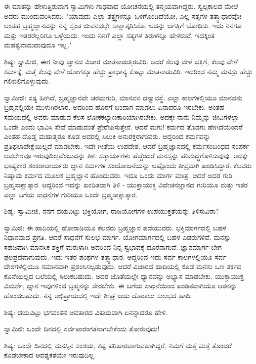 ಈ ಮಾತನ್ನು ಹೇಳುತ್ತಿರುವಾಗ ಸ್ವಾಮಿಗಳು ಗಾಢವಾದ ಯೋಚನೆಯಲ್ಲಿ ತನ್ಮಯವಾಗಿದ್ದರು. ಸ್ವಲ್ಪಕಾಲದ ಮೇಲೆ ಅವರು ಮುಂದುವರಿಸಿದರು: "ಯಾವುದು ಎಲ್ಲಾ ತತ್ತ್ವಗಳನ್ನೂ ಒಳಗೊಂಡಿದೆಯೋ, ಎಲ್ಲ ಸತ್ಯಗಳ ತತ್ತ್ವಾಧಾರವೋ ಅಂತಹ ಬ್ರಹ್ಮಜ್ಞಾನವನ್ನು ನಿನ್ನ ಸ್ವಂತ ಜೀವನದಲ್ಲೇ ಸಾಕ್ಷಾತ್ಕರಿಸಿಕೊ. ಅದನ್ನು ಜಗತ್ತಿಗೆ ಬೋಧಿಸು. ಇದು ನಿನಗೂ ಮತ್ತು ಇತರರೆಲ್ಲರಿಗೂ ಒಳ್ಳೆಯದು. ಇಂದು ನಿನಗೆ ಎಲ್ಲಾ ಸತ್ಯಗಳ ತಿರುಳನ್ನೂ ಹೇಳಿರುವೆ, ಇದಕ್ಕಿಂತ ಮಹತ್ವವಾದುದಾವುದೂ ಇಲ್ಲ."

ಶಿಷ್ಯ: ಸ್ವಾಮಿಜಿ, ಈಗ ನೀವು ಜ್ಞಾನದ ವಿಚಾರ ಮಾತನಾಡುತ್ತಿರುವಿರಿ. ಆದರೆ ಕೆಲವು ವೇಳೆ ಭಕ್ತಿಗೆ, ಕೆಲವು ವೇಳೆ ಕರ್ಮಕ್ಕೆ, ಮತ್ತೆ ಕೆಲವು ವೇಳೆ ಯೋಗಕ್ಕೂ ಹೆಚ್ಚು ಪ್ರಾಧಾನ್ಯ ಕೊಟ್ಟು ಮಾತನಾಡುವಿರಿ. ಇದರಿಂದ ನಮ್ಮ ಮನಸ್ಸು ಹೆಚ್ಚು ಗಲಿಬಿಲಿಗೊಳ್ಳುವುದು.

ಸ್ವಾಮೀಜಿ: ಸತ್ಯ ಹೀಗಿದೆ, ಬ್ರಹ್ಮಜ್ಞಾನವೇ ಚರಮಗುರಿ, ಮಾನವನ ಧನ್ಯಾವಸ್ಥೆ. ಎಲ್ಲಾ ಕಾಲಗಳಲ್ಲಿಯೂ ಮಾನವನು ಬ್ರಹ್ಮನಲ್ಲಿಯೇ ಮುಳುಗಿರಲಾರ. ಅದರಿಂದ ಹೊರಗೆ ಬಂದಾಗ ಮಾಡಲು ಏನಾದರೂ ಇರಬೇಕು. ಅಂತಹ ಸಮಯದಲ್ಲಿ ಅವರು ಮಾಡುವ ಕೆಲಸ ಲೋಕಕಲ್ಯಾಣಕಾರಿಯಾಗಿರಬೇಕು. ಅದಕ್ಕೇ ನಾನು ನಿಮ್ಮನ್ನು ಜೀವಿಗಳೆಲ್ಲಾ ಒಂದೇ ಎಂದು ಭಾವಿಸಿ ಸೇವೆ ಮಾಡುವಂತೆ ಪ್ರೇರೇಪಿಸುತ್ತೇನೆ. ಆದರೆ ಮಗು! ಕರ್ಮದ ತೊಡಗು ಹೇಗಿದೆಯೆಂದರೆ ಎಂತಹ ದೊಡ್ಡ ಮಹಾತ್ಮರೂ ಕೂಡ ಅದರಲ್ಲಿ ಸಿಲುಕಿ ಅನುರಕ್ತರಾಗುವರು. ಆದ್ದರಿಂದ ಕರ್ಮವನ್ನು ಪ್ರತಿಫಲಾಪೇಕ್ಷೆಯಿಲ್ಲದೆ ಮಾಡಬೇಕು. ಇದೇ ಗೀತೆಯ ಉಪದೇಶ. ಆದರೆ ಬ್ರಹ್ಮಜ್ಞಾನದಲ್ಲಿ ಕರ್ಮಸಂಬಂಧದ ಸಂಪರ್ಕ ಲವಲೇಶವೂ ಇರುವುದಿಲ್ಲವೆಂಬುದನ್ನು ತಿಳಿ. ಸತ್ಕಾರ್ಯಗಳು ಹೆಚ್ಚೆಂದರೆ ಮನಸ್ಸನ್ನು ಪರಿಶುದ್ಧಗೊಳಿಸುವುವು. ಅದಕ್ಕೇ ಭಾಷ್ಯಕಾರ ಶಂಕರಾಚಾರ್ಯರು ಜ್ಞಾನ ಕರ್ಮಗಳ ಸಂಯೋಜನೆಯನ್ನು ಅಷ್ಟೊಂದು ತೀವ್ರವಾಗಿ ಖಂಡಿಸಿದ್ದಾರೆ. ಕೆಲವರು ನಿಷ್ಕಾಮ ಕರ್ಮದ ಮೂಲಕ ಬ್ರಹ್ಮಜ್ಞಾನ ಹೊಂದುವರು. ಇದೂ ಒಂದು ಮಾರ್ಗ ಮಾತ್ರ. ಆದರೆ ಅದರ ಗುರಿ ಬ್ರಹ್ಮಸಾಕ್ಷಾತ್ಕಾರ. ಆದ್ದರಿಂದ ಇದನ್ನು ಖಂಡಿತವಾಗಿ ತಿಳಿ - ಯುಕ್ತಾಯುಕ್ತ ವಿವೇಚನಜ್ಞಾನದ ಗುರಿಯೂ ಮತ್ತು ಇತರ ಎಲ್ಲಾ ಬಗೆಯ ಸಾಧನೆಗಳ ಗುರಿಯೂ ಒಂದೇ ಬ್ರಹ್ಮಸಾಕ್ಷಾತ್ಕಾರ.

ಶಿಷ್ಯ: ಸ್ವಾಮೀಜಿ, ನನಗೆ ದಯವಿಟ್ಟು ಭಕ್ತಿಯೋಗ, ರಾಜಯೋಗಗಳ ಉಪಯುಕ್ತತೆಯನ್ನು ತಿಳಿಸುವಿರಾ?

ಸ್ವಾಮಿಜಿ: ಈ ಹಾದಿಯಲ್ಲಿ ಹೋರಾಡಿಯೂ ಕೆಲವರು ಬ್ರಹ್ಮಜ್ಞಾನ ಪಡೆಯುವರು. ಭಕ್ತಿಮಾರ್ಗದಲ್ಲಿ ಬಹಳ ನಿಧಾನವಾದ ಪ್ರಗತಿ. ಆದರೆ ಸಾಧನೆಗೆ ಸುಲಭ ಮಾರ್ಗ. ಯೋಗಮಾರ್ಗದಲ್ಲಿ ಬಹಳ ಎಡರುಗಳಿವೆ. ಮನಸ್ಸು ಸಹಜವಾಗಿ ಮಾನಸಿಕ ಶಕ್ತಿಗೆ ಮರುಳಾಗಿ ಅದರಿಂದ ನಿನ್ನ ಸ್ವಭಾವಕ್ಕೆ ದೂರನಾಗುವೆ. ಜ್ಞಾನಮಾರ್ಗ ಬೇಗ ಫಲಪ್ರದವಾಗುವುದು. ಇದು ಇತರ ಪಂಥಗಳ ತತ್ತ್ವಾಧಾರ. ಆದ್ದರಿಂದ ಇದು ಸರ್ವ ಕಾಲಗಳಲ್ಲಿಯೂ ಸರ್ವ ದೇಶಗಳಲ್ಲಿಯೂ ಸಮಾನವಾಗಿ ಪ್ರಶಂಸಿಸಲ್ಪಡುವುದು. ಆದರೆ ವಿಚಾರದ ಹಾದಿಯಲ್ಲಿ ಕೂಡ ಮನಸು ಒಣ ತರ್ಕದ ಕೊನೆಯಿಲ್ಲದ ಬಲೆಯಲ್ಲಿ ಸಿಲುಕಬಹುದು. ಅದರ ಜೊತೆಯಲ್ಲೇ ಧ್ಯಾನವನ್ನು ಅಭ್ಯಾಸ ಮಾಡಬೇಕು. ಯುಕ್ತಾಯುಕ್ತ ವಿಮರ್ಶೆ, ಧ್ಯಾನ ಇವುಗಳಿಂದ ಬ್ರಹ್ಮನನ್ನು ಸೇರಬೇಕು. ಈ ಬಗೆಯ ಸಾಧನೆಯಿಂದ ಖಂಡಿತವಾಗಿಯೂ ಆತನನ್ನು ಹೊಂದಬಹುದು. ನನ್ನ ಅಭಿಪ್ರಾಯದಲ್ಲಿ ಇದೇ ಶೀಘ್ರ ಜಯ ದೊರಕಲು ಸುಲಭದ ಹಾದಿ.

ಶಿಷ್ಯ: ದಯವಿಟ್ಟು ಭಗವಂತನ ಅವತಾರದ ವಿಷಯವಾಗಿ ಏನನ್ನಾದರೂ ಹೇಳಿ.

ಸ್ವಾಮಿಜಿ: ಒಂದೇ ದಿನದಲ್ಲಿ ಸರ್ವಪಾರಂಗತನಾಗಬೇಕೆಂದು ತೋರುವುದು!

ಶಿಷ್ಯ: ಒಂದೇ ದಿನದಲ್ಲಿ ಮನಸ್ಸಿನ ಸಂಶಯ, ಕಷ್ಟ ಪರಿಹಾರವಾಗುವಹಾಗಿದ್ದರೆ, ನಿಮಗೆ ಮತ್ತೆ ಮತ್ತೆ ತೊಂದರೆ ಕೊಡಬೇಕಾದ ಆವಶ್ಯಕತೆಯೇ ಇರುವುದಿಲ್ಲ.

